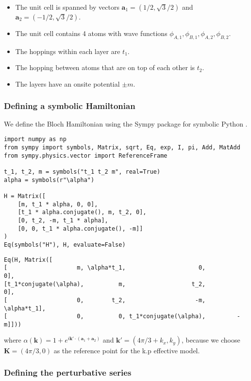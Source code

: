 \documentclass[submission, Codebases]{SciPost}
\begin{document}
{{\begin{itemize}
\item The unit cell is spanned by vectors $\mathbf{a}_1 = (1/2, \sqrt{3}/2)$ and $\mathbf{a}_2=( -1/2, \sqrt{3}/2)$.
\item The unit cell contains 4 atoms with wave functions $\phi_{A,1}, \phi_{B,1}, \phi_{A,2}, \phi_{B,2}$.
\item The hoppings within each layer are $t_1$.
\item The hopping between atoms that are on top of each other is $t_2$.
\item The layers have an onsite potential $\pm m$.
\end{itemize}

\subsubsection{Defining a symbolic Hamiltonian}

We define the Bloch Hamiltonian using the Sympy package for symbolic Python
\cite{Meurer_2017}.

\begin{verbatim}
import numpy as np
from sympy import symbols, Matrix, sqrt, Eq, exp, I, pi, Add, MatAdd
from sympy.physics.vector import ReferenceFrame

t_1, t_2, m = symbols("t_1 t_2 m", real=True)
alpha = symbols(r"\alpha")

H = Matrix([
    [m, t_1 * alpha, 0, 0],
    [t_1 * alpha.conjugate(), m, t_2, 0],
    [0, t_2, -m, t_1 * alpha],
    [0, 0, t_1 * alpha.conjugate(), -m]]
)
Eq(symbols("H"), H, evaluate=False)
\end{verbatim}

\begin{verbatim}
Eq(H, Matrix([
[                    m, \alpha*t_1,                     0,          0],
[t_1*conjugate(\alpha),          m,                   t_2,          0],
[                    0,        t_2,                    -m, \alpha*t_1],
[                    0,          0, t_1*conjugate(\alpha),         -m]]))
\end{verbatim}

where $\alpha(\mathbf{k}) = 1 + e^{i \mathbf{k'} \cdot (\mathbf{a}_1 +
\mathbf{a}_2)}$ and $\mathbf{k'} = (4\pi/3 + k_x, k_y)$, because we choose
$\mathbf{K}=(4\pi/3, 0)$ as the reference point for the k.p effective model.

\subsubsection{Defining the perturbative series}

}}
\end{document}
